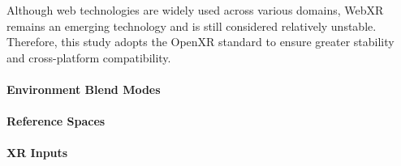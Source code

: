 Although web technologies are widely used across various domains, WebXR remains an emerging technology and is still considered relatively unstable. Therefore, this study adopts the OpenXR standard to ensure greater stability and cross-platform compatibility.


\paragraph{Environment Blend Modes}

\paragraph{Reference Spaces}

\paragraph{XR Inputs}